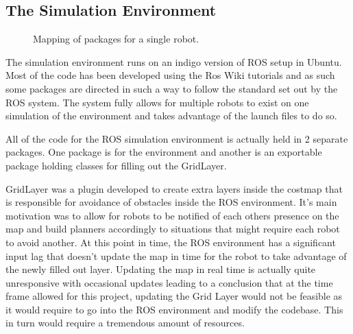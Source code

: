     \subsection{The Simulation Environment}
      \begin{figure}[htp]
          \caption{Mapping of packages for a single robot.}
        \end{figure}
      The simulation environment runs on an indigo version of ROS setup in Ubuntu. Most of the code has been developed using the Ros Wiki tutorials and as such some packages are directed in such a way to follow the standard set out by the ROS system. The system fully allows for multiple robots to exist on one simulation of the environment and takes advantage of the launch files to do so.

      All of the code for the ROS simulation environment is actually held in 2 separate packages. One package is for the environment and another is an exportable package holding classes for filling out the GridLayer.

      GridLayer was a plugin developed to create extra layers inside the costmap that is responsible for avoidance of obstacles inside the ROS environment. It's main motivation was to allow for robots to be notified of each others presence on the map and build planners accordingly to situations that might require each robot to avoid another. At this point in time, the ROS environment has a significant input lag that doesn't update the map in time for the robot to take advantage of the newly filled out layer. Updating the map in real time is actually quite unresponsive with occasional updates leading to a conclusion that at the time frame allowed for this project, updating the Grid Layer would not be feasible as it would require to go into the ROS environment and modify the codebase. This in turn would require a tremendous amount of resources.

